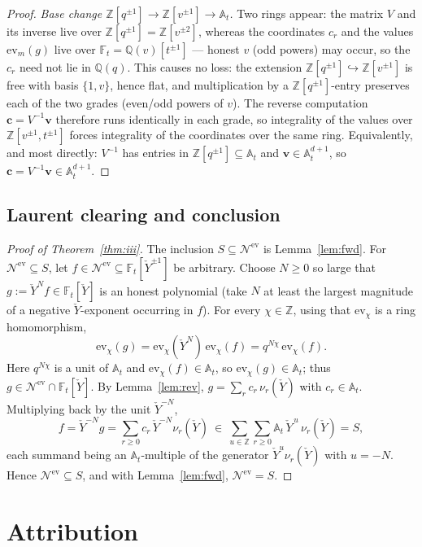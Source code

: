 \documentclass[11pt]{article}
\newcommand{\At}{\mathbb{A}_t}
\newcommand{\Ft}{\mathbb{F}_t}
\newcommand{\Nev}{\mathcal N^{\mathrm{ev}}}
\newcommand{\Yc}{\check Y}
\newcommand{\Z}{\mathbb Z}
\newcommand{\ev}{\mathrm{ev}}
\begin{document}
\begin{proof}
\smallskip
\emph{Base change $\Z[q^{\pm1}]\to\Z[v^{\pm1}]\to\At$.}\;
Two rings appear: the matrix $V$ and its inverse live over
$\Z[q^{\pm1}]=\Z[v^{\pm2}]$, whereas the coordinates $c_r$ and the values
$\ev_m(g)$ live over $\Ft=\mathbb Q(v)[t^{\pm1}]$ --- honest $v$ (odd powers) may
occur, so the $c_r$ need not lie in $\mathbb Q(q)$. This causes no loss: the
extension $\Z[q^{\pm1}]\hookrightarrow\Z[v^{\pm1}]$ is free with basis
$\{1,v\}$, hence flat, and multiplication by a $\Z[q^{\pm1}]$-entry preserves
each of the two grades (even/odd powers of $v$). The reverse computation
$\mathbf c=V^{-1}\mathbf v$ therefore runs identically in each grade, so
integrality of the values over $\Z[v^{\pm1},t^{\pm1}]$ forces integrality of the
coordinates over the same ring. Equivalently, and most directly:
$V^{-1}$ has entries in $\Z[q^{\pm1}]\subseteq\At$ and $\mathbf v\in\At^{d+1}$,
so $\mathbf c=V^{-1}\mathbf v\in\At^{d+1}$.
\end{proof}

\subsection{Laurent clearing and conclusion}

\begin{proof}[Proof of Theorem~\ref{thm:iii}]
The inclusion $S\subseteq\Nev$ is Lemma~\ref{lem:fwd}. For $\Nev\subseteq S$,
let $f\in\Nev\subseteq\Ft[\Yc^{\pm1}]$ be arbitrary. Choose $N\ge0$ so large that
$g:=\Yc^{N}f\in\Ft[\Yc]$ is an honest polynomial (take $N$ at least the largest
magnitude of a negative $\Yc$-exponent occurring in $f$). For every $\chi\in\Z$,
using that $\ev_\chi$ is a ring homomorphism,
\[
  \ev_\chi(g)=\ev_\chi(\Yc^{N})\,\ev_\chi(f)=q^{N\chi}\,\ev_\chi(f).
\]
Here $q^{N\chi}$ is a unit of $\At$ and $\ev_\chi(f)\in\At$, so
$\ev_\chi(g)\in\At$; thus $g\in\Nev\cap\Ft[\Yc]$. By Lemma~\ref{lem:rev},
$g=\sum_{r}c_r\,\nu_r(\Yc)$ with $c_r\in\At$. Multiplying back by the unit
$\Yc^{-N}$,
\[
  f=\Yc^{-N}g=\sum_{r\ge0}c_r\,\Yc^{-N}\nu_r(\Yc)
   \ \in\ \sum_{u\in\Z}\sum_{r\ge0}\At\,\Yc^{\,u}\,\nu_r(\Yc)=S,
\]
each summand being an $\At$-multiple of the generator $\Yc^{u}\nu_r(\Yc)$ with
$u=-N$. Hence $\Nev\subseteq S$, and with Lemma~\ref{lem:fwd}, $\Nev=S$.
\end{proof}

\section{Attribution}
\end{document}
